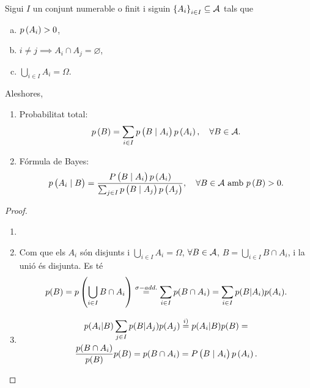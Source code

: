\begin{prop}
    Sigui $I$ un conjunt numerable o finit i siguin $\left\{ A_i \right\}_{i\in I} \subseteq \mathcal{A}$ tals que 
    \begin{enumerate}[a)]
        \item $p\left( A_i\right)>0$,
        \item $i\neq j \implies A_i \cap A_j = \varnothing$,
        \item $\bigcup\limits_{i\in I} A_i = \Omega$.
    \end{enumerate}
    Aleshores,
    \begin{enumerate}[1)]
        \item Probabilitat total:
            \[
                p\left( B\right)=\sum_{i\in I} p\left( B\mid A_i\right) p\left( A_i\right), \quad \forall B\in \mathcal{A}.
            \]
        \item Fórmula de Bayes:
            \[
                p\left( A_i\mid B\right)=\frac{P\left( B\mid A_i\right) p\left( A_i\right)}{\sum_{j\in I} p\left( B\mid A_j\right) p\left( A_j\right)}, \quad \forall B\in \mathcal{A} \text{ amb } p\left( B\right)>0.
            \]
    \end{enumerate}
\end{prop}

\begin{proof}
    \begin{enumerate}[1)]
        \item[]
        \item Com que els $A_i$ són disjunts i $\bigcup_{i \in I}{A_i} = \Omega$, $\forall B \in \mathcal{A}$,
        $B = \bigcup_{i\in I}{B \cap A_i}$, i la unió és disjunta. Es té
        \[
            p(B) = p\left(\bigcup_{i\in I}{B \cap A_i}\right) \stackrel{\sigma-add.}{=} \sum_{i\in I}{p(B \cap A_i)} =
            \sum_{i\in I}{p(B|A_i)p(A_i)}.
        \]
        \item
        \begin{gather*}
            p(A_i|B) \sum_{j \in I}{p(B|A_j)p(A_j)} \stackrel{i)}{=} p(A_i|B)p(B) =\\
            \frac{p(B\cap A_i)}{p(B)}p(B) = p(B \cap A_i) = P\left( B\mid A_i\right) p\left( A_i\right).
        \end{gather*}
    \end{enumerate}
\end{proof}

